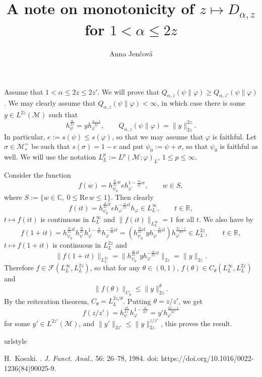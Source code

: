 \documentclass[12pt]{article}
\title{A note on monotonicity of  $z\mapsto D_{\alpha,z}$ for $1<\alpha\le 2z$}
\author{Anna Jen\v cov\'a}
\theoremstyle{definition}
\theoremstyle{remark}
\def\Me{\mathcal M}
\def\Fe{\mathcal F}
\begin{document}
\maketitle



Assume that $1<\alpha\le 2z\le 2z'$. 
We will prove that $Q_{\alpha,z}(\psi\|\varphi)\ge Q_{\alpha,z'}(\psi\|\varphi)$. We may
clearly assume that $Q_{\alpha,z}(\psi\|\varphi)<\infty$, in which case there is some
$y\in L^{2z}(\Me)$ such that
\[
h_\psi^{\frac{\alpha}{2z}}=yh_\varphi^{\frac{\alpha-1}{2z}},\qquad
Q_{\alpha,z}(\psi\|\varphi)=\|y\|_{2z}^{2z}.
\]
In particular, $e:=s(\psi)\le s(\varphi)$, so that we may assume that $\varphi$ is
faithful. Let $\sigma\in \Me_*^+$ be such that
$s(\sigma)=1-e$ and put $\psi_0:=\psi+\sigma$, so that $\psi_0$ is faithful as well. We will use the notation
$L^p_L:=L^p(\Me;\varphi)_L$, $1\le p\le \infty$.

Consider the function 
\[
f(w)=h_{\psi_0}^{\frac{\alpha}{2z}w}eh_\varphi^{1-\frac{\alpha}{2z}w},\qquad w\in S,
\]
where $S:=\{w\in \mathbb C,\ 0\le \mathrm{Re}\,w\le 1\}$. Then clearly
\[
f(it)=h_{\psi_0}^{\frac{\alpha}{2z}it}eh_\varphi^{-\frac{\alpha}{2z}it}h_\varphi\in
L^\infty_L,\qquad t\in \mathbb R,
\]
$t\mapsto f(it)$ is continuous in $L^\infty_L$ and $\|f(it)\|_{L^\infty_L}=1$ for all $t$.
We also have by \cite[Lemmas 10.1 and 10.2]{kosaki1984applications}
\[
f(1+it)=h_{\psi_0}^{\frac{\alpha}{2z}it}h_\psi^{\frac{\alpha}{2z}}h_\varphi^{1-\frac{\alpha}{2z}}h_\varphi^{-\frac{\alpha}{2z}it}=
(h_{\psi_0}^{\frac{\alpha}{2z}it}yh_\varphi^{-\frac{\alpha}{2z}it})h_\varphi^{\frac{2z-1}{2z}}\in
L^{2z}_L,\qquad t\in \mathbb R,
\]
 $t\mapsto f(1+it)$ is continuous in $L^{2z}_L$ and 
\[
 \|f(1+it)\|_{L^{2z}_L}=\|h_{\psi_0}^{\frac{\alpha}{2z}it}yh_\varphi^{-\frac{\alpha}{2z}it}\|_{2z}=\|y\|_{2z}.
\]
Therefore $f\in \Fe(L^\infty_L, L^{2z}_L)$, so that for any $\theta\in (0,1)$, $f(\theta)\in
C_\theta(L^\infty_L,L^{2z}_L)$ and 
\[
\|f(\theta)\|_{C_\theta}\le \|y\|_{2z}^\theta.
\]
By the reiteration theorem, $C_\theta=L^{2z/\theta}_L$. Putting $\theta=z/z'$, we get
\[
f(z/z')=h_{\psi}^{\frac{\alpha}{2z'}}h_\varphi^{1-\frac{\alpha}{2z'}}=y'h_\varphi^{\frac{2z'-1}{2z'}}
\]
for some $y'\in L^{2z'}(\Me)$, and  $\|y'\|_{2z'}\le \|y\|_{2z}^{z/z'}$, this proves the result.

\begin{thebibliography}{5}
\providecommand{\natexlab}[1]{#1}
\providecommand{\url}[1]{\texttt{#1}}
\expandafter\ifx\csname urlstyle\endcsname\relax
  \providecommand{\doi}[1]{doi: #1}\else
  \providecommand{\doi}{doi: \begingroup \urlstyle{rm}\Url}\fi



H.~Kosaki.
.
\newblock \emph{{J. Funct. Anal.}}, {56}: {26--78}, {1984}.
\newblock \doi{https://doi.org/10.1016/0022-1236(84)90025-9}.

\end{thebibliography}
\end{document}
